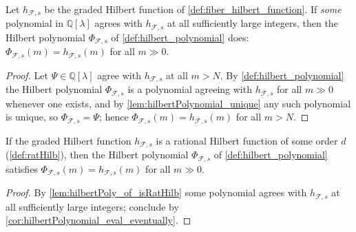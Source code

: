 \begin{corollary}
  \label{cor:hilbertPolynomial_eval_eventually}
  Let \(h_{\mathcal{F},s}\) be the graded Hilbert function of
  \cref{def:fiber_hilbert_function}. If \emph{some} polynomial in
  \(\mathbb{Q}[\lambda]\) agrees with \(h_{\mathcal{F},s}\) at all
  sufficiently large integers, then the Hilbert polynomial
  \(\Phi_{\mathcal{F},s}\) of \cref{def:hilbert_polynomial} does:
  \(\Phi_{\mathcal{F},s}(m) = h_{\mathcal{F},s}(m)\) for all \(m \gg 0\).
\end{corollary}

\begin{proof}
  \leanok
  Let \(\Psi \in \mathbb{Q}[\lambda]\) agree with \(h_{\mathcal{F},s}\) at all
  \(m > N\). By \cref{def:hilbert_polynomial} the Hilbert polynomial
  \(\Phi_{\mathcal{F},s}\) is a polynomial agreeing with
  \(h_{\mathcal{F},s}\) for all \(m \gg 0\) whenever one exists, and by
  \cref{lem:hilbertPolynomial_unique} any such polynomial is unique, so
  \(\Phi_{\mathcal{F},s} = \Psi\); hence
  \(\Phi_{\mathcal{F},s}(m) = h_{\mathcal{F},s}(m)\) for all \(m > N\).
\end{proof}

\begin{corollary}
  \label{cor:hilbertPolynomial_eval_of_isRatHilb}
  If the graded Hilbert function \(h_{\mathcal{F},s}\) is a rational Hilbert
  function of some order \(d\) (\cref{def:ratHilb}), then the Hilbert
  polynomial \(\Phi_{\mathcal{F},s}\) of \cref{def:hilbert_polynomial}
  satisfies \(\Phi_{\mathcal{F},s}(m) = h_{\mathcal{F},s}(m)\) for all
  \(m \gg 0\).
\end{corollary}

\begin{proof}
  \leanok
  By \cref{lem:hilbertPoly_of_isRatHilb} some polynomial agrees with
  \(h_{\mathcal{F},s}\) at all sufficiently large integers; conclude by
  \cref{cor:hilbertPolynomial_eval_eventually}.
\end{proof}

